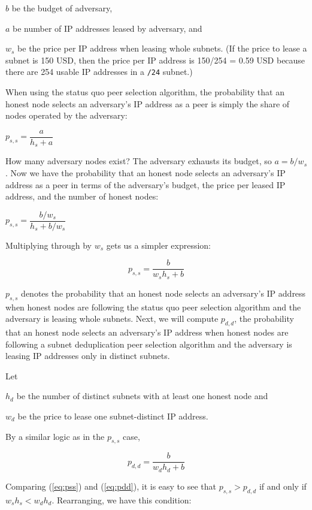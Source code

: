 \documentclass[usletter,11pt,english,openany]{article}
\begin{document}
$b$ be the budget of adversary,

$a$ be number of IP addresses leased by adversary, and

$w_{s}$ be the price per IP address when leasing whole subnets. (If
the price to lease a subnet is 150 USD, then the price per IP address
is 150/254 = 0.59 USD because there are 254 usable IP addresses in
a \texttt{/24} subnet.)

When using the status quo peer selection algorithm, the probability
that an honest node selects an adversary's IP address as a peer is
simply the share of nodes operated by the adversary:

$p_{s,s}=\dfrac{a}{h_{s}+a}$

How many adversary nodes exist? The adversary exhausts its budget,
so $a=b/w_{s}$. Now we have the probability that an honest node selects
an adversary's IP address as a peer in terms of the adversary's budget,
the price per leased IP address, and the number of honest nodes:

$p_{s,s}=\dfrac{b/w_{s}}{h_{s}+b/w_{s}}$

Multiplying through by $w_{s}$ gets us a simpler expression:

\begin{equation}
p_{s,s}=\dfrac{b}{w_{s}h_{s}+b}\label{eq:pss}
\end{equation}

$p_{s,s}$ denotes the probability that an honest node selects an
adversary's IP address when honest nodes are following the status
quo peer selection algorithm and the adversary is leasing whole subnets.
Next, we will compute $p_{d,d}$, the probability that an honest node
selects an adversary's IP address when honest nodes are following
a subnet deduplication peer selection algorithm and the adversary
is leasing IP addresses only in distinct subnets.

Let 

$h_{d}$ be the number of distinct subnets with at least one honest
node and

$w_{d}$ be the price to lease one subnet-distinct IP address.

By a similar logic as in the $p_{s,s}$ case,

\begin{equation}
p_{d,d}=\dfrac{b}{w_{d}h_{d}+b}\label{eq:pdd}
\end{equation}

Comparing (\ref{eq:pss}) and (\ref{eq:pdd}), it is easy to see that
$p_{s,s}>p_{d,d}$ if and only if $w_{s}h_{s}<w_{d}h_{d}$. Rearranging,
we have this condition:
\end{document}
